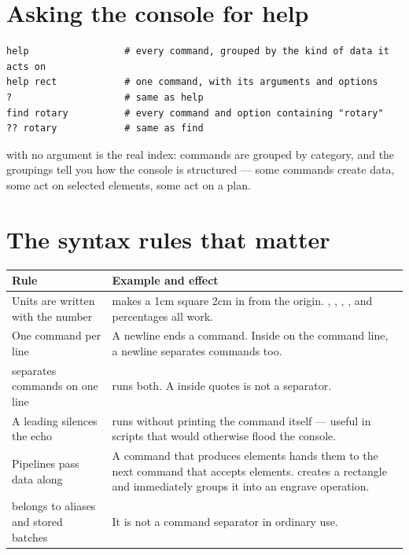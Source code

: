 \section{Asking the console for help}

\begin{lstlisting}[style=konsole]
help                 # every command, grouped by the kind of data it acts on
help rect            # one command, with its arguments and options
?                    # same as help
find rotary          # every command and option containing "rotary"
?? rotary            # same as find
\end{lstlisting}

\noindent {} with no argument is the real index: commands are grouped by
category, and the groupings tell you how the console is structured --- some
commands create data, some act on selected elements, some act on a plan.

\section{The syntax rules that matter}

\begin{center}\small
\begin{tabular}{@{}L{4.0cm}L{10.2cm}@{}}
\toprule
\textbf{Rule} & \textbf{Example and effect} \\
\midrule
Units are written with the number &  makes a
1\unit{cm} square 2\unit{cm} in from the origin. , ,
, ,  and percentages all work. \\
One command per line & A newline ends a command. Inside  on the
command line, a newline separates commands too. \\
\cmd{|} separates commands on one line &  runs both.
A \cmd{|} inside quotes is not a separator. \\
A leading  silences the echo &  runs without
printing the command itself --- useful in scripts that would otherwise flood the
console. \\
Pipelines pass data along & A command that produces elements hands them to the
next command that accepts elements.  creates a
rectangle and immediately groups it into an engrave operation. \\
\cmd{; } belongs to aliases and stored batches & It is not a command separator in
ordinary use. \\
\bottomrule
\end{tabular}
\end{center}

